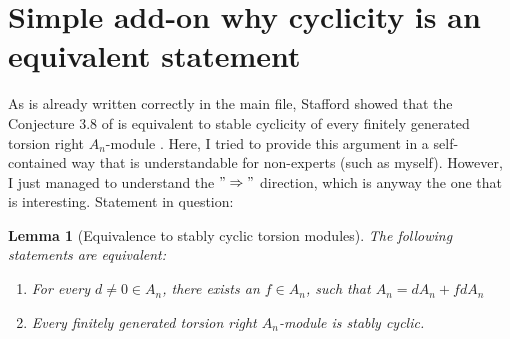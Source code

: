 \documentclass[11pt]{amsart}
\date{\today}
\newtheorem{lemma}[theorem]{Lemma}
\theoremstyle{definition}
\begin{document}
\section{Simple add-on why cyclicity is an equivalent statement}
As is already written correctly in the main file, Stafford showed that the Conjecture 3.8 of \cite[p.~438]{Stafford1978}
is equivalent to stable cyclicity of every finitely generated torsion right $A_n$-module \cite[pp.~437--438]{Stafford1978}. Here, I tried to provide this argument in a self-contained way that is understandable for non-experts (such as myself). However, I just managed to understand the $"\Rightarrow"$ direction, which is anyway the one that is interesting. 
Statement in question:\\
\begin{lemma}[Equivalence to stably cyclic torsion modules]
The following statements are equivalent:
\begin{enumerate}
    \item For every $d\neq 0 \in A_n$, there exists an $f \in A_n$, such that $A_n = dA_n + fdA_n$
    \item Every finitely generated torsion right $A_n$-module is stably cyclic. 
\end{enumerate}
\end{lemma}
\end{document}
